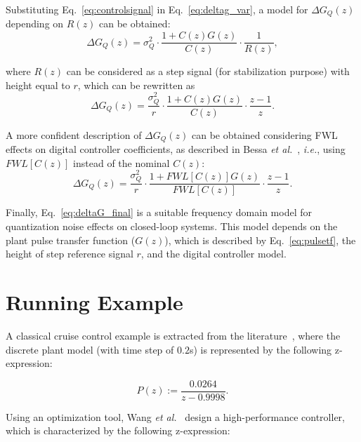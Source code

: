 \documentclass{sig-alternate-05-2015}
\begin{document}
Substituting Eq.~\eqref{eq:controlsignal} in Eq.~\eqref{eq:deltag_var}, a model for $\Delta{G_{Q}(z)}$ depending on $R(z)$ can be obtained:
%
\begin{equation}
\Delta{G_{Q}(z)}=\sigma^{2}_{Q}\cdot \frac{1+C(z)G(z)}{C(z)} \cdot \frac{1}{R(z)},
\end{equation}

\noindent where $R(z)$ can be considered as a step signal (for stabilization purpose) with height equal to $r$, which can be rewritten as
\begin{equation}
\Delta{G_{Q}(z)}=\frac{\sigma^{2}_{Q}}{r}\cdot \frac{1+C(z)G(z)}{C(z)} \cdot \frac{z-1}{z}.
\end{equation}

A more confident description of $\Delta{G_{Q}(z)}$ can be obtained considering FWL effects on digital controller coefficients, as described in Bessa {\it et al.}~\cite{Bessa16}, {\it i.e.}, using $FWL[C(z)]$ instead of the nominal $C(z)$:
%
\begin{equation}
\label{eq:deltaG_final}
\Delta{G_{Q}(z)}=\frac{\sigma^{2}_{Q}}{r}\cdot \frac{1+FWL[C(z)]G(z)}{FWL[C(z)]} \cdot \frac{z-1}{z}.
\end{equation}

Finally, Eq.~\eqref{eq:deltaG_final} is a suitable frequency domain model for quantization noise effects on closed-loop systems. This model depends on the plant pulse transfer function ($G(z)$), which is described by Eq.~\eqref{eq:pulsetf}, the height of step reference signal $r$, and the digital controller model.


\section{Running Example} \label{sec:running-ex}

A classical cruise control example is extracted from the literature~\cite{Astrom08}, where the discrete plant model (with time step of $0.2$s) is represented by the following z-expression:

\begin{equation}
\label{Eq:running-example-plant}
P\left(z\right) := \frac{0.0264}{z-0.9998}.
\end{equation}

Using an optimization tool, Wang {\it et al.}~\cite{DBLP:conf/hybrid/WangGRJF16} design a high-performance controller, which is characterized by the following z-expression:
\end{document}
